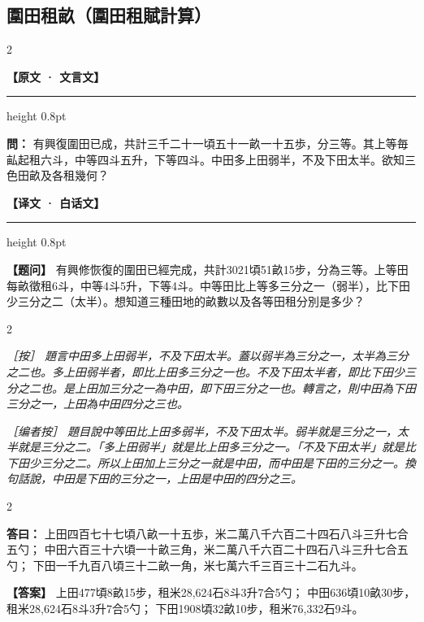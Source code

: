 \documentclass[11pt,a4paper]{article}
\newcommand{\ClassicalQuestion}[1]{\par\noindent\textbf{\color{problemcolor}問：}#1\par}
\newcommand{\ClassicalAnswer}[1]{\par\noindent\textbf{\color{answercolor}答曰：}#1\par}
\newcommand{\ClassicalNote}[1]{\par\noindent\textit{［按］#1}\par}
\newcommand{\ModernQuestion}[1]{\par\noindent\textbf{\color{modernlabel}【题问】}#1\par}
\newcommand{\ModernAnswer}[1]{\par\noindent\textbf{\color{answercolor}【答案】}#1\par}
\newcommand{\ModernNote}[1]{\par\noindent\textit{\color{notecolor}［编者按］#1}\par}
\newcommand{\ClassicalHeader}{%
  \begin{center}\textbf{\color{headerclassical}【原文 · 文言文】}\end{center}
  \vspace{-0.5em}
  \hrule height 0.8pt
  \vspace{0.5em}
}
\newcommand{\ModernHeader}{%
  \begin{center}\textbf{\color{headermodern}【译文 · 白话文】}\end{center}
  \vspace{-0.5em}
  \hrule height 0.8pt
  \vspace{0.5em}
}
\begin{document}
\newpage
\subsection*{\color{sectioncolor}圍田租畝（圍田租賦計算）}

\begin{paracol}{2}

\ClassicalHeader

\ClassicalQuestion{%
有興復圍田已成，共計三千二十一頃五十一畝一十五歩，分三等。其上等毎畆起租六斗，中等四斗五升，下等四斗。中田多上田弱半，不及下田太半。欲知三色田畝及各租幾何？}

\switchcolumn

\ModernHeader

\ModernQuestion{%
有興修恢復的圍田已經完成，共計3021頃51畝15步，分為三等。上等田每畝徵租6斗，中等4斗5升，下等4斗。中等田比上等多三分之一（弱半），比下田少三分之二（太半）。想知道三種田地的畝數以及各等田租分別是多少？
}

\end{paracol}

\begin{paracol}{2}

\ClassicalNote{%
題言中田多上田弱半，不及下田太半。蓋以弱半為三分之一，太半為三分之二也。多上田弱半者，即比上田多三分之一也。不及下田太半者，即比下田少三分之二也。是上田加三分之一為中田，即下田三分之一也。轉言之，則中田為下田三分之一，上田為中田四分之三也。}

\switchcolumn

\ModernNote{%
題目說中等田比上田多弱半，不及下田太半。弱半就是三分之一，太半就是三分之二。「多上田弱半」就是比上田多三分之一。「不及下田太半」就是比下田少三分之二。所以上田加上三分之一就是中田，而中田是下田的三分之一。換句話說，中田是下田的三分之一，上田是中田的四分之三。
}

\end{paracol}

\begin{paracol}{2}

\ClassicalAnswer{%
上田四百七十七頃八畝一十五歩，米二萬八千六百二十四石八斗三升七合五勺；
中田六百三十六頃一十畝三角，米二萬八千六百二十四石八斗三升七合五勺；
下田一千九百八頃三十二畝一角，米七萬六千三百三十二石九斗。}

\switchcolumn

\ModernAnswer{%
上田477頃8畝15步，租米28,624石8斗3升7合5勺；
中田636頃10畝30步，租米28,624石8斗3升7合5勺；
下田1908頃32畝10步，租米76,332石9斗。}

\end{paracol}
\end{document}
